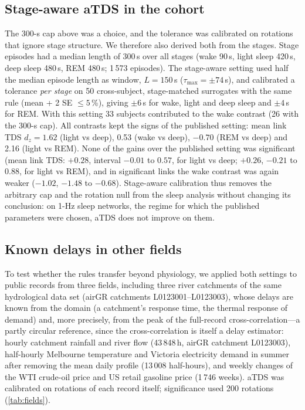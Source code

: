 \documentclass[11pt,a4paper]{article}
\begin{document}
\subsection{Stage-aware aTDS in the cohort}
\label{sec:res-stage}
The 300-s cap above was a choice, and the tolerance was calibrated on rotations that ignore stage structure. We therefore also derived both from the stages. Stage episodes had a median length of 300\,s over all stages (wake 90\,s, light sleep 420\,s, deep sleep 480\,s, REM 480\,s; 1\,573 episodes). The stage-aware setting used half the median episode length as window, $L = 150$\,s ($\tau_{\max} = \pm74$\,s), and calibrated a tolerance \emph{per stage} on 50 cross-subject, stage-matched surrogates with the same rule (mean + 2 SE $\le 5$\,\%), giving $\pm6$\,s for wake, light and deep sleep and $\pm4$\,s for REM. With this setting 33 subjects contributed to the wake contrast (26 with the 300-s cap). All contrasts kept the signs of the published setting: mean link TDS $d_z = 1.62$ (light vs deep), 0.53 (wake vs deep), $-0.70$ (REM vs deep) and 2.16 (light vs REM). None of the gains over the published setting was significant (mean link TDS: $+0.28$, interval $-0.01$ to $0.57$, for light vs deep; $+0.26$, $-0.21$ to $0.88$, for light vs REM), and in significant links the wake contrast was again weaker ($-1.02$, $-1.48$ to $-0.68$). Stage-aware calibration thus removes the arbitrary cap and the rotation null from the sleep analysis without changing its conclusion: on 1-Hz sleep networks, the regime for which the published parameters were chosen, aTDS does not improve on them.

\subsection{Known delays in other fields}
\label{sec:res-fields}
To test whether the rules transfer beyond physiology, we applied both settings to public records from three fields, including three river catchments of the same hydrological data set (airGR catchments L0123001--L0123003), whose delays are known from the domain (a catchment's response time, the thermal response of demand) and, more precisely, from the peak of the full-record cross-correlation---a partly circular reference, since the cross-correlation is itself a delay estimator: hourly catchment rainfall and river flow (43\,848\,h, airGR catchment L0123003), half-hourly Melbourne temperature and Victoria electricity demand in summer after removing the mean daily profile (13\,008 half-hours), and weekly changes of the WTI crude-oil price and US retail gasoline price (1\,746 weeks). aTDS was calibrated on rotations of each record itself; significance used 200 rotations (\cref{tab:fields}).
\end{document}
